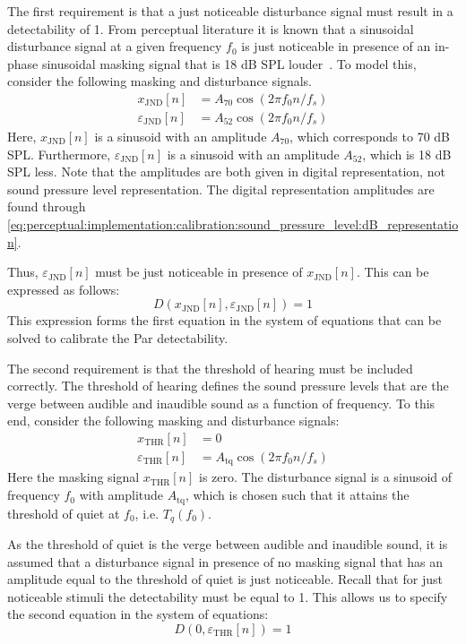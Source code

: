 The first requirement is that a just noticeable disturbance signal must result in a detectability of 1.
From perceptual literature it is known that a sinusoidal disturbance signal at a given frequency $f_0$ is just noticeable 
in presence of an in-phase sinusoidal masking signal that is 18 dB SPL louder~\cite{van2005perceptual}.
To model this, consider the following masking and disturbance signals. 
\begin{align}
    x_\text{JND}[n] &= A_{70}\cos\left(2\pi f_0 n / f_s\right) \\
    \varepsilon_\text{JND}[n] &= A_{52}\cos\left(2\pi f_0 n / f_s\right)
\end{align}
Here, $x_\text{JND}[n]$ is a sinusoid with an amplitude $A_{70}$, which corresponds to 70 dB SPL.
Furthermore, $\varepsilon_\text{JND}[n]$ is a sinusoid with an amplitude $A_{52}$, which is 18 dB SPL less.
Note that the amplitudes are both given in digital representation, not sound pressure level representation.
The digital representation amplitudes are found through \autoref{eq:perceptual:implementation:calibration:sound_pressure_level:dB_representation}.

Thus, $\varepsilon_\text{JND}[n]$ must be just noticeable in presence of $x_\text{JND}[n]$.
This can be expressed as follows:
\begin{equation}
    D(x_\text{JND}[n],\varepsilon_\text{JND}[n]) = 1
    \label{eq:perceptual:implementation:calibration:coefficients:first}
\end{equation}
This expression forms the first equation in the system of equations that can be solved to calibrate the Par detectability.

The second requirement is that the threshold of hearing must be included correctly.
The threshold of hearing defines the sound pressure levels that are the verge between audible and inaudible sound as a function of frequency.
To this end, consider the following masking and disturbance signals:
\begin{align}
    x_\text{THR}[n] &= 0 \\
    \varepsilon_\text{THR}[n] &= A_{\text{tq}}\cos\left(2\pi f_0 n / f_s\right)
\end{align}
Here the masking signal $x_\text{THR}[n]$ is zero. 
The disturbance signal is a sinusoid of frequency $f_0$ with amplitude $A_{\text{tq}}$, which is chosen such that it attains 
the threshold of quiet at $f_0$, i.e. $T_q(f_0)$. 

As the threshold of quiet is the verge between audible and inaudible sound, it is assumed that a disturbance signal in presence of no masking signal that has
an amplitude equal to the threshold of quiet is just noticeable.
Recall that for just noticeable stimuli the detectability must be equal to 1.
This allows us to specify the second equation in the system of equations:
\begin{equation}
    D(0,\varepsilon_\text{THR}[n]) = 1
    \label{eq:perceptual:implementation:calibration:coefficients:second}
\end{equation}

